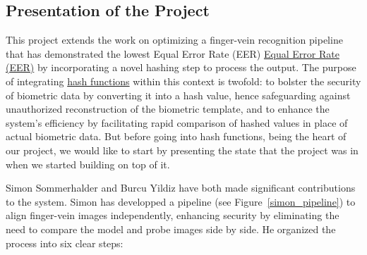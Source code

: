 \subsection{Presentation of the Project}


This project extends the work on optimizing a finger-vein recognition pipeline that has demonstrated the lowest Equal Error Rate (EER) \hyperref[def:EER]{Equal Error Rate (EER)} by incorporating a novel hashing step to process the output. The purpose of integrating \hyperref[def:Hash_Function]{hash functions} within this context is twofold: to bolster the security of biometric data by converting it into a hash value, hence safeguarding against unauthorized reconstruction of the biometric template, and to enhance the system's efficiency by facilitating rapid comparison of hashed values in place of actual biometric data. But before going into hash functions, being the heart of our project, we would like to start by presenting the state that the project was in when we started building on top of it.

Simon Sommerhalder and Burcu Yildiz have both made significant contributions to the system. Simon has developped a pipeline (see Figure~\ref{simon_pipeline}) to align finger-vein images independently, enhancing security by eliminating the need to compare the model and probe images side by side. He organized the process into six clear steps:

